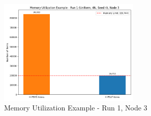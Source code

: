\documentclass[]{interact}
\theoremstyle{plain}
\theoremstyle{definition}
\theoremstyle{remark}
\begin{document}
\begin{figure}[H]
    \centering
    \includegraphics[width=0.6\textwidth]{src/out_matplotlib_charts/perf_memory_util_example.png}
    \caption{Memory Utilization Example - Run 1, Node 3}
    \label{fig:m5}
\end{figure}
\end{document}
